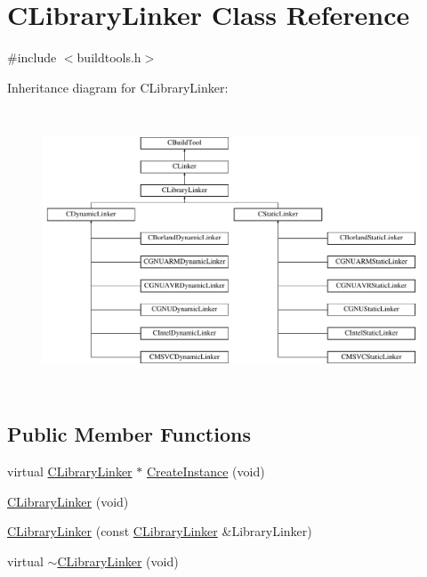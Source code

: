 \hypertarget{classCLibraryLinker}{\section{C\-Library\-Linker Class Reference}
\label{classCLibraryLinker}
}


{\ttfamily \#include $<$buildtools.\-h$>$}

Inheritance diagram for C\-Library\-Linker\-:\begin{figure}[H]
\begin{center}
\leavevmode
\includegraphics[height=8.383233cm]{df/d43/classCLibraryLinker}
\end{center}
\end{figure}
\subsection*{Public Member Functions}
\begin{DoxyCompactItemize}
\item 
virtual \hyperlink{classCLibraryLinker}{C\-Library\-Linker} $\ast$ \hyperlink{classCLibraryLinker_a02b85c6bc81ad2973ee9a578412a1fa0}{Create\-Instance} (void)
\item 
\hyperlink{classCLibraryLinker_a7fc487106f71f171c15186d6335e3ab0}{C\-Library\-Linker} (void)
\item 
\hyperlink{classCLibraryLinker_a804803dde5295ef609179daf12dee48e}{C\-Library\-Linker} (const \hyperlink{classCLibraryLinker}{C\-Library\-Linker} \&Library\-Linker)
\item 
virtual \hyperlink{classCLibraryLinker_ac9de66fedc3e398fa69d413650b31510}{$\sim$\-C\-Library\-Linker} (void)
\end{DoxyCompactItemize}
